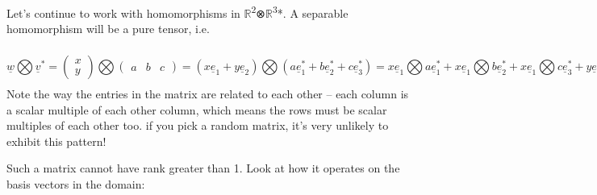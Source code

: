 \documentclass[oneside,english]{amsbook}
\numberwithin{section}{chapter}
\theoremstyle{plain}
\theoremstyle{definition}
\begin{document}
Let's continue to work with homomorphisms in
$\mathbb{R}$\textsuperscript{2}⊗$\mathbb{R}$\textsuperscript{3}*. A
separable homomorphism will be a pure tensor, i.e.

\[{\underline{w}\bigotimes{\underline{v}}^{*} = \begin{pmatrix}
		x \\
		y
	\end{pmatrix}\bigotimes\begin{pmatrix}
		a & b & c
	\end{pmatrix}
}{= \left( x{\underline{e}}_{1} + y{\underline{e}}_{2} \right)\bigotimes\left( a{\underline{e}}_{1}^{*} + b{\underline{e}}_{2}^{*} + c{\underline{e}}_{3}^{*} \right)
}{= x{\underline{e}}_{1}\bigotimes a{\underline{e}}_{1}^{*} + x{\underline{e}}_{1}\bigotimes b{\underline{e}}_{2}^{*} + x{\underline{e}}_{1}\bigotimes c{\underline{e}}_{3}^{*} + y{\underline{e}}_{2}\bigotimes a{\underline{e}}_{1}^{*} + y{\underline{e}}_{2}\bigotimes b{\underline{e}}_{2}^{*} + y{\underline{e}}_{2}\bigotimes c{\underline{e}}_{3}^{*}
}{= ax{\underline{e}}_{1}\bigotimes{\underline{e}}_{1}^{*} + bx{\underline{e}}_{1}\bigotimes{\underline{e}}_{2}^{*} + cx{\underline{e}}_{1}\bigotimes{\underline{e}}_{3}^{*} + ay{\underline{e}}_{2}\bigotimes{\underline{e}}_{1}^{*} + by{\underline{e}}_{2}\bigotimes{\underline{e}}_{2}^{*} + cy{\underline{e}}_{2}\bigotimes{\underline{e}}_{3}^{*}
}{= \begin{pmatrix}
		ax & \begin{matrix}
			bx & cx
		\end{matrix} \\
		ay & \begin{matrix}
			by & cy
		\end{matrix}
	\end{pmatrix}
}\]Note the way the entries in the matrix are related to each other --
each column is a scalar multiple of each other column, which means the
rows must be scalar multiples of each other too. if you pick a random
matrix, it's very unlikely to exhibit this pattern!

Such a matrix cannot have rank greater than 1. Look at how it operates
on the basis vectors in the domain:
\end{document}

